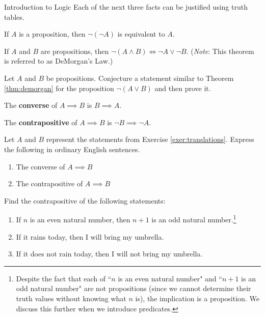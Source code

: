 \begin{section}{Introduction to Logic}
Each of the next three facts can be justified using truth tables.

\begin{theorem}
If $A$ is a proposition, then $\neg(\neg A)$ is equivalent to $A$.
\end{theorem}

\begin{theorem}\label{thm:demorgan}
If $A$ and $B$ are propositions, then $\neg(A \wedge B) \iff \neg A \vee \neg B$.  (\emph{Note}: This theorem is referred to as DeMorgan's Law.)
\end{theorem}

\begin{problem}
Let $A$ and $B$ be propositions.  Conjecture a statement similar to Theorem \ref{thm:demorgan} for the proposition $\neg(A\vee B)$ and then prove it.
\end{problem}

\begin{definition}\label{def:converse}
The \textbf{converse} of $A \implies B$ is $B \implies A$.
\end{definition}

\begin{definition}
The \textbf{contrapositive} of $A \implies B$ is $\neg B \implies \neg A$.
\end{definition}

\begin{exercise}
Let $A$ and $B$ represent the statements from Exercise \ref{exer:translations}.  Express the following in ordinary English sentences.
\begin{enumerate}
\item The converse of $A \implies B$
\item The contrapositive of $A \implies B$
\end{enumerate}
\end{exercise}

\begin{exercise} Find the contrapositive of the following statements: 
\begin{enumerate}
\item If $n$ is an even natural number, then $n+1$ is an odd natural number.\footnote{Despite the fact that each of ``$n$ is an even natural number" and ``$n+1$ is an odd natural number" are not propositions (since we cannot determine their truth values without knowing what $n$ is), the implication is a proposition.  We discuss this further when we introduce predicates.}
\item If it rains today, then I will bring my umbrella.
\item If it does not rain today, then I will not bring my umbrella.
\end{enumerate} \end{exercise}


\end{section}
